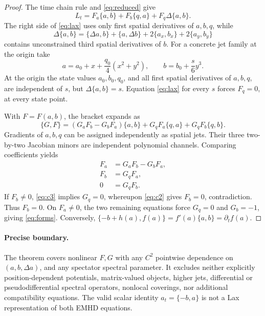 \documentclass[11pt,a4paper]{article}
\begin{document}
\begin{proof}
The time chain rule and \eqref{eq:reduced} give
\begin{equation}\label{eq:lhs}
 L_t=F_a\{a,b\}+F_b\{q,a\}+F_q\Delta\{a,b\}.
\end{equation}
The right side of \eqref{eq:lax} uses only first spatial
derivatives of \(a,b,q\), while
\begin{equation}\label{eq:delta}
 \Delta\{a,b\}
 =\{\Delta a,b\}+\{a,\Delta b\}
 +2\{a_x,b_x\}+2\{a_y,b_y\}
\end{equation}
contains unconstrained third spatial derivatives of \(b\).
For a concrete jet family at the origin take
\[
 a=a_0+x+\frac{q_0}{4}(x^2+y^2),\qquad
 b=b_0+\frac{s}{6}y^3.
\]
At the origin the state values \(a_0,b_0,q_0\), and all first
spatial derivatives of \(a,b,q\), are independent of \(s\),
but \(\Delta\{a,b\}=s\). Equation \eqref{eq:lax}
for every \(s\) forces \(F_q=0\), at every state point.

With \(F=F(a,b)\), the bracket expands as
\[
 \{G,F\}=(G_aF_b-G_bF_a)\{a,b\}
     +G_qF_a\{q,a\}+G_qF_b\{q,b\}.
\]
Gradients of \(a,b,q\) can be assigned independently as
spatial jets. Their three two-by-two Jacobian minors are
independent polynomial channels. Comparing coefficients yields
\begin{align}
 F_a&=G_aF_b-G_bF_a,\label{eq:c1}\\
 F_b&=G_qF_a,\label{eq:c2}\\
 0&=G_qF_b.\label{eq:c3}
\end{align}
If \(F_b\ne0\), \eqref{eq:c3} implies \(G_q=0\),
whereupon \eqref{eq:c2} gives \(F_b=0\), contradiction.
Thus \(F_b=0\). On \(F_a\ne0\), the two remaining
equations force \(G_q=0\) and \(G_b=-1\), giving
\eqref{eq:forms}. Conversely,
\(\{-b+h(a),f(a)\}=f'(a)\{a,b\}=\partial_tf(a)\).
\end{proof}

\paragraph{Precise boundary.}
The theorem covers nonlinear \(F,G\) with any \(C^2\)
pointwise dependence on \((a,b,\Delta a)\), and any spectator
spectral parameter. It excludes neither explicitly
position-dependent potentials, matrix-valued objects,
higher jets, differential or pseudodifferential spectral
operators, nonlocal coverings, nor additional compatibility
equations. The valid scalar identity
\(a_t=\{-b,a\}\) is not a Lax representation of both EMHD
equations.
\end{document}
